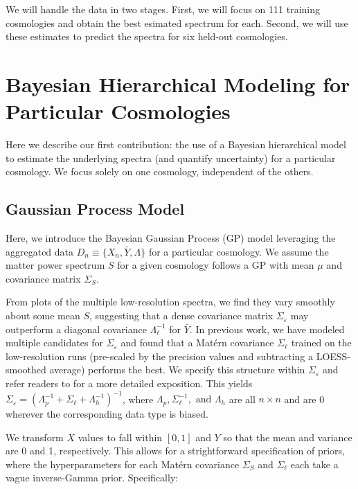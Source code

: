 \documentclass[11pt]{article}
\begin{document}
We will handle the data in two stages.  First, we will focus on 111 training cosmologies and obtain the best esimated spectrum for each.  Second, we will use these estimates to predict the spectra for six held-out cosmologies.

\section{Bayesian Hierarchical Modeling for Particular Cosmologies}
\label{sec:hm_fit}

Here we describe our first contribution: the use of a Bayesian hierarchical model to estimate the underlying spectra (and quantify uncertainty) for a particular cosmology.  We focus solely on one cosmology, independent of the others.

\subsection{Gaussian Process Model}

Here, we introduce the Bayesian Gaussian Process (GP) model leveraging the aggregated data $D_n \equiv \{X_n, \bar Y, \Lambda\}$ for a particular cosmology. We assume the matter power spectrum $S$ for a given cosmology follows a GP with mean $\mu$ and covariance matrix $\Sigma_S$.

From plots of the multiple low-resolution spectra, we find they vary smoothly about some mean $S$, suggesting that a dense covariance matrix $\Sigma_\varepsilon$ may outperform a diagonal covariance $\Lambda_\ell^{-1}$ for $\bar Y$. In previous work, we have modeled multiple candidates for $\Sigma_\varepsilon$ \citep{walsh2023bayesian} and found that a Mat\'ern covariance $\Sigma_\ell$ trained on the low-resolution runs (pre-scaled by the precision values and subtracting a LOESS-smoothed average) performs the best. We specify this structure within $\Sigma_\varepsilon$ and refer readers to \cite{walsh2023bayesian} for a more detailed exposition. This yields $\Sigma_\varepsilon=\left(\Lambda_p^{-1} + \Sigma_\ell + \Lambda_h^{-1}\right)^{-1}$, where $\Lambda_p, \Sigma_\ell^{-1}, \text{ and } \Lambda_h$ are all $n\times n$ and are 0 wherever the corresponding data type is biased.

We transform $X$ values to fall within $[0,1]$ and $Y$ so that the mean and variance are 0 and 1, respectively. This allows for a strightforward specification of priors, where the hyperparameters for each Mat\'ern covariance $\Sigma_S$ and $\Sigma_\ell$ each take a vague inverse-Gamma prior. Specifically:
\end{document}

